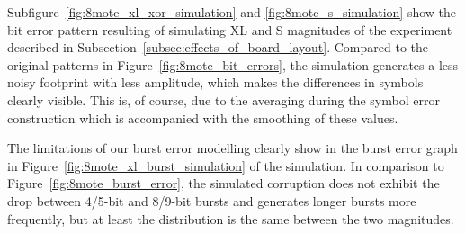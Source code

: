 Subfigure~\ref{fig:8mote_xl_xor_simulation} and \ref{fig:8mote_s_simulation} show the bit error pattern resulting of simulating XL and S magnitudes of the experiment described in Subsection~\ref{subsec:effects_of_board_layout}.
Compared to the original patterns in Figure~\ref{fig:8mote_bit_errors}, the simulation generates a less noisy footprint with less amplitude, which makes the differences in symbols clearly visible.
This is, of course, due to the averaging during the symbol error construction which is accompanied with the smoothing of these values.

The limitations of our burst error modelling clearly show in the burst error graph in Figure~\ref{fig:8mote_xl_burst_simulation} of the simulation. In comparison to Figure~\ref{fig:8mote_burst_error}, the simulated corruption does not exhibit the drop between 4/5-bit and 8/9-bit bursts and generates longer bursts more frequently, but at least the distribution is the same between the two magnitudes.

